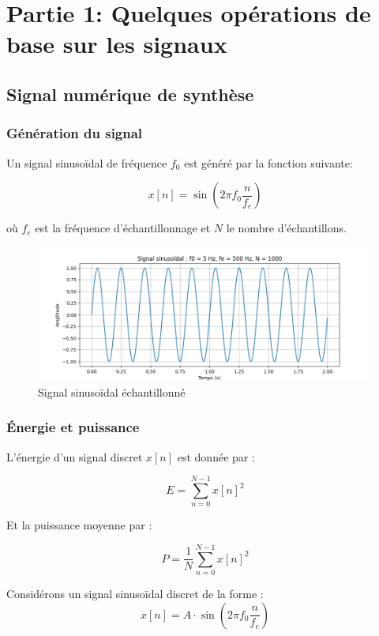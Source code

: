 \newpage

\section{Partie 1: Quelques opérations de base sur les signaux}

\subsection{Signal numérique de synthèse}

\subsubsection{Génération du signal}

Un signal sinusoïdal de fréquence \( f_0 \) est généré par la fonction suivante:

\[
x[n] = \sin\left(2\pi f_0 \frac{n}{f_e}\right)
\]

où \( f_e \) est la fréquence d’échantillonnage et \( N \) le nombre d’échantillons.

\begin{figure}[!h]
\centering
\includegraphics[width=17cm]{screenshots/signal_echantillone.png}
\caption{Signal sinusoïdal échantillonné}
\end{figure}

\subsubsection{Énergie et puissance}

L'énergie d’un signal discret \( x[n] \) est donnée par :

\[
E = \sum_{n=0}^{N-1} x[n]^2
\]

Et la puissance moyenne par :

\[
P = \frac{1}{N} \sum_{n=0}^{N-1} x[n]^2
\]

Considérons un signal sinusoïdal discret de la forme :
\[
x[n] = A \cdot \sin\left(2\pi f_0 \frac{n}{f_e} \right)
\]

